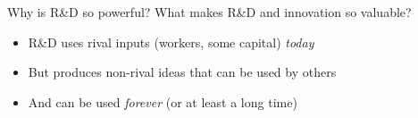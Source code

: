\begin{frame}{Why is R\&D so powerful?}
What makes R\&D and innovation so valuable?
\begin{itemize}
	\item R\&D uses rival inputs (workers, some capital) \textit{today}
	\item But produces non-rival ideas that can be used by others
	\item And can be used \textit{forever} (or at least a long time)
\end{itemize}
\end{frame}

